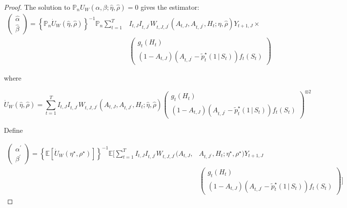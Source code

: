 \documentclass[12pt]{article}
\def\E{\mathbb{E}}
\def\P{\mathbb{P}}
\def\given{\, | \,}
\begin{document}
\begin{proof}
The solution to $\P_n U_W(\alpha,\beta;\hat\eta,\hat\rho) = 0$ gives the estimator:
\begin{align*}
    \begin{pmatrix}
  \hat \alpha \\
  \hat \beta
\end{pmatrix} =
\left\{ \P_n \dot U_W(\hat\eta,\hat\rho) \right \}^{-1} \P_n \sum_{t=1}^T &I_{t,J}I_{t,J^\prime} W_{t,J, J^\prime}(A_{t,J},A_{t,J^\prime},H_t; \hat \eta,\hat \rho) Y_{t+1,J} \times \\
&\begin{pmatrix}
  g_t(H_t) \\
  (1-A_{t,J})(A_{t,J^\prime} - \tilde {p}^\star_t (1 \given S_t) ) f_t (S_t)
\end{pmatrix}
\end{align*}


where

\[
\dot U_W(\hat\eta,\hat\rho) = \sum_{t=1}^T I_{t,J}I_{t,J^\prime}W_{t,J, J^\prime}(A_{t,J},A_{t,J^\prime},H_t; \hat\eta,\hat\rho) \begin{pmatrix}
  g_t(H_t) \\
  (1-A_{t,J})(A_{t,J^\prime} - \tilde {p}^\star_t (1 \given S_t) ) f_t (S_t)
\end{pmatrix}^ {\otimes 2}
\]

Define

\begin{align*}
    \begin{pmatrix}
  \alpha^\prime \\
  \beta^\prime
\end{pmatrix} = \left\{ \E \left[ \dot U_W(\eta^\star,\rho^\star) \right]\right\}^{-1}  \E \Bigg[ \sum_{t=1}^T I_{t,J}I_{t,J^\prime} W_{t,J, J^\prime}(A_{t,J},&A_{t,J^\prime},H_t; \eta^\star,\rho^\star) Y_{t+1,J} \nonumber \\
&\begin{pmatrix}
  g_t(H_t) \\
  (1-A_{t,J})(A_{t,J^\prime} - \tilde {p}^\star_t (1 \given S_t) ) f_t (S_t)
\end{pmatrix} \Bigg]
\end{align*}



\end{proof}
\end{document}
